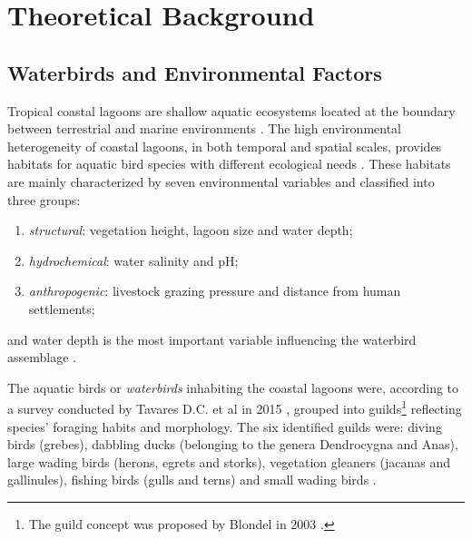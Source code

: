 %
%
%
%


\section{Theoretical Background}

\subsection{Waterbirds and Environmental Factors}
 Tropical coastal lagoons are shallow aquatic ecosystems located at the boundary between terrestrial and marine environments \cite{tavares2015environmental}. The high environmental heterogeneity of coastal lagoons, in both temporal and spatial scales, provides habitats for aquatic bird species with different ecological needs \cite{ntiamoa1998water, paracuellos2004factors, tavares2013inventory}. These habitats are mainly characterized by seven environmental variables and classified into three groups:
 \begin{enumerate}
     \item \emph{structural}: vegetation height, lagoon size and water depth;
     \item \emph{hydrochemical}: water salinity and pH;
     \item \emph{anthropogenic}: livestock grazing pressure and distance from human settlements;
 \end{enumerate}
and water depth is the most important variable influencing the waterbird assemblage \cite{tavares2015environmental}.

 The aquatic birds or \emph{waterbirds} inhabiting the coastal lagoons were, according to a survey conducted by Tavares D.C. et al in 2015 \cite{tavares2015environmental}, grouped into guilds\footnote{The guild concept was proposed by Blondel in 2003 \cite{blondel2003guilds}.} reflecting species' foraging habits and morphology. The six identified guilds were: diving birds (grebes), dabbling ducks (belonging to the genera Dendrocygna and Anas), large wading birds (herons, egrets and storks), vegetation gleaners (jacanas and gallinules), fishing birds (gulls and terns) and small wading birds \cite{tavares2014variaccao}.

